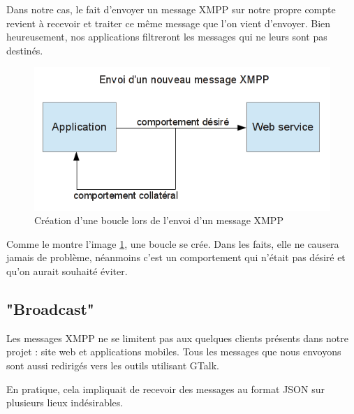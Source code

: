 Dans notre cas, le fait d'envoyer un message XMPP sur notre propre compte revient à recevoir et traiter ce même message que l'on vient d'envoyer.
Bien heureusement, nos applications filtreront les messages qui ne leurs sont pas destinés.

\begin{figure}[!h]
	\center
	\includegraphics[width=12cm]{img/boucle-envoi-xmpp.png}
	\caption{Création d'une boucle lors de l'envoi d'un message XMPP}
	\label{boucle-envoi-xmpp}
\end{figure}

Comme le montre l'image \ref{boucle-envoi-xmpp}, une boucle se crée.
Dans les faits, elle ne causera jamais de problème, néanmoins c'est un comportement qui n'était pas désiré et qu'on aurait souhaité éviter.




\subsection{"Broadcast"}

Les messages XMPP ne se limitent pas aux quelques clients présents dans notre projet : site web et applications mobiles.
Tous les messages que nous envoyons sont aussi redirigés vers les outils utilisant GTalk.

En pratique, cela impliquait de recevoir des messages au format JSON sur plusieurs lieux indésirables.

